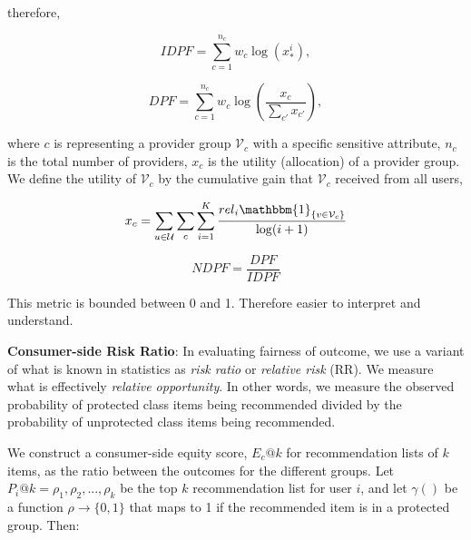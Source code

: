         therefore,
        
        \begin{equation*}
            \text{$IDPF$}=\sum_{c=1}^{n_c} w_c \log\left(x_*^i\right),
        \end{equation*}
        
        
        \begin{equation*}
            \text{$DPF$}=\sum_{c=1}^{n_c} w_c \log\left(\frac{x_c}{\sum_{c'}x_{c'}}\right),
        \end{equation*}
        
        where $c$ is representing a provider group $\mathcal V_c$ with a specific sensitive attribute, $n_c$ is the total number of providers, $x_c$ is the utility (allocation) of a provider group. We define the utility of $\mathcal V_c$ by the cumulative gain that $\mathcal V_c$ received from all users,
        
        \begin{equation*}
        x_c=\sum_{u\in\mathcal U}\sum_{c}\sum_{i=1}^K\frac{{rel}_i\mathbbm{1}_{\{v\in \mathcal V_{c}\}}}{\log(i+1)}
        \end{equation*}
        
        \begin{equation*}
            NDPF = \frac{DPF}{IDPF}
        \end{equation*}

        This metric is bounded between 0 and 1. Therefore easier to interpret and understand.
        
        
        
        \textbf{Consumer-side Risk Ratio}: In evaluating fairness of outcome, we use a variant of what is known in statistics as \textit{risk ratio} or \textit{relative risk} (RR)\cite{romei2014multidisciplinary}. We measure what is effectively \textit{relative opportunity}. In other words, we measure the observed probability of protected class items being recommended divided by the probability of unprotected class items being recommended.
        
        We construct a consumer-side equity score, $E_c@k$ for recommendation lists of $k$ items, as the ratio between the outcomes for the different groups. Let $P_i@k = {\rho_1, \rho_2, ..., \rho_k}$ be the top $k$ recommendation list for user $i$, and let $\gamma()$ be a function $\rho \rightarrow \{0,1\}$ that maps to 1 if the recommended item is in a protected group. Then:

